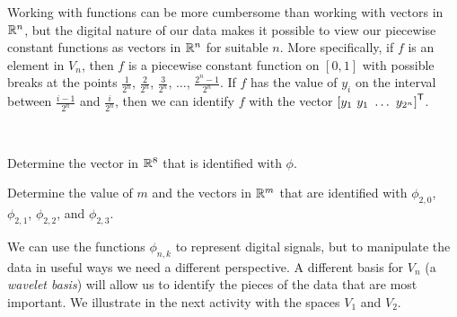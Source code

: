 Working with functions can be more cumbersome than working with vectors in $\mathbb{R}^n$, but the digital nature of our data makes it possible to view our piecewise constant functions as vectors in $\mathbb{R}^n$ for suitable $n$. More specifically, if $f$ is an element  in $V_n$, then $f$ is a piecewise constant function on $[0,1]$ with possible breaks at the points $\frac{1}{2^n}$, $\frac{2}{2^n}$, $\frac{3}{2^n}$, $\ldots$, $\frac{2^n-1}{2^n}$. If $f$ has the value of $y_i$ on the interval between $\frac{i-1}{2^n}$ and $\frac{i}{2^n}$, then we can identify $f$ with the vector $\left[y_1 \ y_1 \ \ldots \ y_{2^n}\right]^{\tr}$. 

\begin{pactivity} \label{act:wavelets_vectors} ~
\ba
\item Determine the vector in $\mathbb{R}^8$ that is identified with $\phi$. 


\item Determine the value of $m$ and the vectors in $\mathbb{R}^m$ that are identified with $\phi_{2,0}$, $\phi_{2,1}$, $\phi_{2,2}$, and $\phi_{2,3}$.


\ea

\end{pactivity}

We can use the functions $\phi_{n,k}$ to represent digital signals, but to manipulate the data in useful ways we need a different perspective. A different basis for $V_n$ (a \emph{wavelet basis}) will allow us to identify the pieces of the data that are most important. We illustrate in the next activity with the spaces $V_1$ and $V_2$. 

